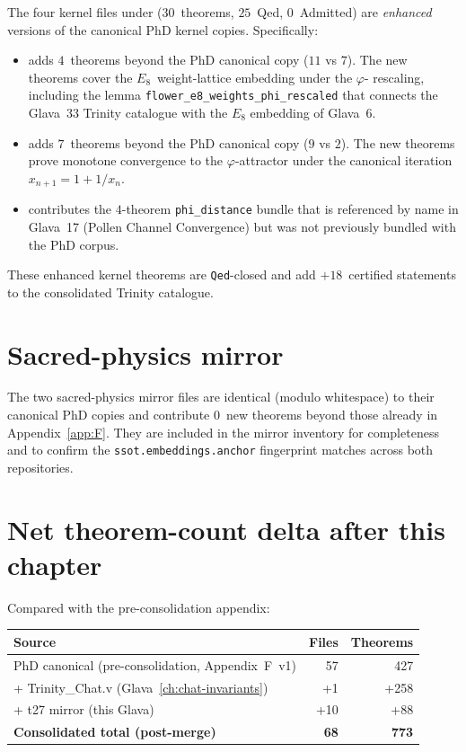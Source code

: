 The four kernel files under  ($30$~theorems,
$25$~Qed, $0$~Admitted) are \emph{enhanced} versions of the canonical
PhD kernel copies. Specifically:

\begin{itemize}
  \item {} adds $4$~theorems
        beyond the PhD canonical copy ($11$ vs $7$). The new theorems
        cover the $E_{8}$~weight-lattice embedding under the $\varphi$-
        rescaling, including the lemma
        \texttt{flower\_e8\_weights\_phi\_rescaled} that connects the
        Glava~33 Trinity catalogue with the $E_{8}$ embedding of
        Glava~6.
  \item {} adds $7$~theorems
        beyond the PhD canonical copy ($9$ vs $2$). The new theorems
        prove monotone convergence to the $\varphi$-attractor under
        the canonical iteration $x_{n+1} = 1 + 1/x_n$.
  \item {} contributes the
        $4$-theorem \texttt{phi\_distance} bundle that is referenced
        by name in Glava~17 (Pollen Channel Convergence) but was not
        previously bundled with the PhD corpus.
\end{itemize}

These enhanced kernel theorems are \texttt{Qed}-closed and add
$+18$~certified statements to the consolidated Trinity catalogue.

\section{Sacred-physics mirror}
\label{sec:ext:sacred}

The two sacred-physics mirror files are identical (modulo whitespace)
to their canonical PhD copies and contribute $0$~new theorems beyond
those already in Appendix~\ref{app:F}. They are included in the mirror
inventory for completeness and to confirm the
\texttt{ssot.embeddings.anchor} fingerprint matches across both
repositories.

\section{Net theorem-count delta after this chapter}
\label{sec:ext:delta}

Compared with the pre-consolidation appendix:

\begin{tabular}{lrr}
\toprule
\textbf{Source} & \textbf{Files} & \textbf{Theorems} \\
\midrule
PhD canonical (pre-consolidation, Appendix~F~v1) & 57 & 427 \\
\quad + Trinity\_Chat.v (Glava~\ref{ch:chat-invariants}) & +1 & +258 \\
\quad + t27 mirror (this Glava) & +10 & +88 \\
\midrule
\textbf{Consolidated total (post-merge)} & \textbf{68} & \textbf{773} \\
\bottomrule
\end{tabular}

